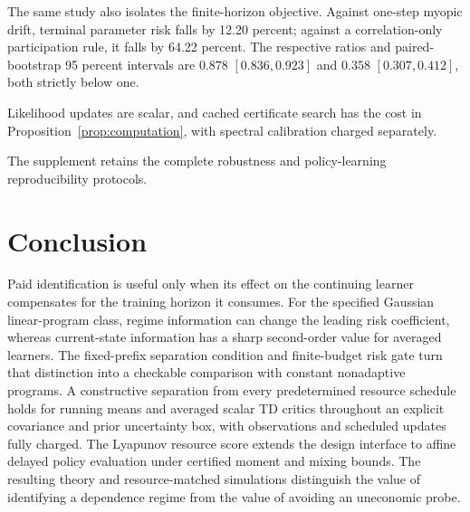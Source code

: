 \documentclass[journal]{IEEEtran}
\begin{document}
The same study also isolates the finite-horizon objective.
Against one-step myopic drift, terminal parameter risk falls by 12.20 percent; against a correlation-only participation rule, it falls by 64.22 percent.
The respective ratios and paired-bootstrap 95 percent intervals are $0.878$ $[0.836,0.923]$ and $0.358$ $[0.307,0.412]$, both strictly below one.

Likelihood updates are scalar, and cached certificate search has the cost in Proposition~\ref{prop:computation}, with spectral calibration charged separately.

The supplement retains the complete robustness and policy-learning reproducibility protocols.

\section{Conclusion}
Paid identification is useful only when its effect on the continuing learner compensates for the training horizon it consumes.
For the specified Gaussian linear-program class, regime information can change the leading risk coefficient, whereas current-state information has a sharp second-order value for averaged learners.
The fixed-prefix separation condition and finite-budget risk gate turn that distinction into a checkable comparison with constant nonadaptive programs.
A constructive separation from every predetermined resource schedule holds for running means and averaged scalar TD critics throughout an explicit covariance and prior uncertainty box, with observations and scheduled updates fully charged.
The Lyapunov resource score extends the design interface to affine delayed policy evaluation under certified moment and mixing bounds.
The resulting theory and resource-matched simulations distinguish the value of identifying a dependence regime from the value of avoiding an uneconomic probe.



\end{document}
